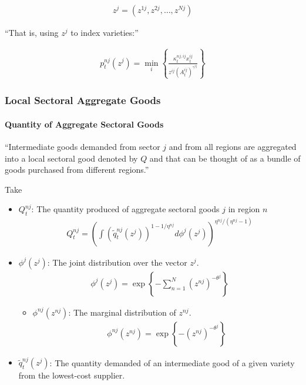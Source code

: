 \documentclass[10pt]{article}
\begin{document}
\begin{align}
    z^j=\left(z^{1 j}, z^{2 j}, \ldots, z^{N j}\right)
\end{align}

``That is, using $z^j$ to index varieties:''

\begin{align}
    p_t^{n j}\left(z^j\right)=\min _i\left\{\frac{\kappa_t^{n j, i j} x_t^{i j}}{z^{i j}\left(A_t^{i j}\right)^{\gamma^{i j}}}\right\}
\end{align}

\subsubsection{Local Sectoral Aggregate Goods}

\paragraph{Quantity of Aggregate Sectoral Goods}

``Intermediate goods demanded 
from sector $j$ 
and from all regions are aggregated 
into a local sectoral good denoted by $Q$
and that can be thought of as a bundle of 
goods purchased from different regions.''

Take 

\begin{itemize}
    \item $Q_t^{n j}$: The quantity produced of aggregate sectoral 
        goods $j$ in region $n$ 
        \begin{align}
            Q_t^{n j}=\left(\int\left(\tilde{q}_t^{n j}\left(z^j\right)\right)^{1-1 / \eta^{n j}} d \phi^j\left(z^j\right)\right)^{\eta^{n j} /\left(\eta^{n j}-1\right)}
        \end{align}
    \item $\phi^j\left(z^j\right)$: The joint distribution over the vector $z^j$.
        \begin{align}
            \phi^j\left(z^j\right)=\exp \left\{-\sum_{n=1}^N\left(z^{n j}\right)^{-\theta^j}\right\}
        \end{align}
        \begin{itemize}
            \item $\phi^{n j}\left(z^{n j}\right)$: The marginal distribution of $z^{n j}$.
                \begin{align}
                    \phi^{n j}\left(z^{n j}\right)=\exp \left\{-\left(z^{n j}\right)^{-\theta^j}\right\}
                \end{align}
        \end{itemize}
    \item $\tilde{q}_t^{n j}\left(z^j\right)$: The 
        quantity demanded of an intermediate good
        of a given variety from the lowest-cost supplier.
\end{itemize}
\end{document}
